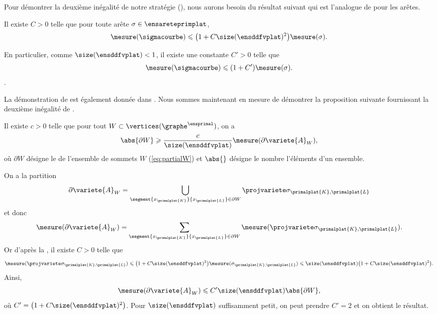 \noindent Pour démontrer la deuxième inégalité de notre stratégie (), nous aurons besoin du résultat suivant qui est l'analogue de  pour les arêtes.
\begin{lemme} \label{prop:mesure_sigmacourbe}
Il existe $C > 0$ telle que pour toute arête $\sigma \in \ensareteprimplat$,
\[
\mesure(\sigmacourbe) \leqslant \big(1 + C \size(\ensddfvplat)^2\big) \mesure(\sigma).
\]
\end{lemme}
\begin{remarque}
En particulier, comme $\size(\ensddfvplat) < 1$, il existe une constante $C' > 0$ telle que
\[
\mesure(\sigmacourbe) \leqslant (1 + C') \mesure(\sigma). 
\]
\areprendre{$\mesure(\sigmacourbe) \leqslant 2 \mesure(\sigma)$}.
\end{remarque}
La démonstration de  est également donnée dans . Nous sommes maintenant en mesure de démontrer la proposition suivante fournissant la deuxième inégalité de .
\begin{prop}
Il existe $c > 0$ telle que pour tout $W \subset \vertices(\graphe^\ensprimal)$, on a
\[
\abs{\partial W} \geqslant \frac{c}{\size(\ensddfvplat)} \mesure(\partial \variete{A}_W),
\]
où $\partial W$ désigne le  de l'ensemble de sommets $W$ (\ref{eq:partialW}) et $\abs{}$ désigne le nombre l'éléments d'un ensemble.
\end{prop}
\begin{demo}
On a la partition
\[
\partial \variete{A}_W = \bigcup_{\segment{x_{\primalplat{K}}}{x_{\primalplat{L}}} \in \partial W} \projvariete \sigma_{\primalplat{K},\primalplat{L}}
\]
et donc
\[
\mesure(\partial \variete{A}_W) = \sum_{\segment{x_{\primalplat{K}}}{x_{\primalplat{L}}} \in \partial W} \mesure(\projvariete \sigma_{\primalplat{K},\primalplat{L}}).
\]
Or d'après la , il existe $C > 0$ telle que
\[
\mesure(\projvariete \sigma_{\primalplat{K},\primalplat{L}})
\leqslant
\big( 1 + C \size(\ensddfvplat)^2 \big) \mesure(\sigma_{\primalplat{K},\primalplat{L}})
\leqslant
\size(\ensddfvplat) \big( 1 + C \size(\ensddfvplat)^2 \big).
\]
Ainsi, 
\[
\mesure(\partial \variete{A}_W) 
\leqslant 
C' \size(\ensddfvplat) \abs{\partial W},
\]
où $C' = \big( 1 + C \size(\ensddfvplat)^2 \big)$. Pour $\size(\ensddfvplat)$ suffisamment petit, on peut prendre $C' = 2$ et on obtient le résultat.
\end{demo}

